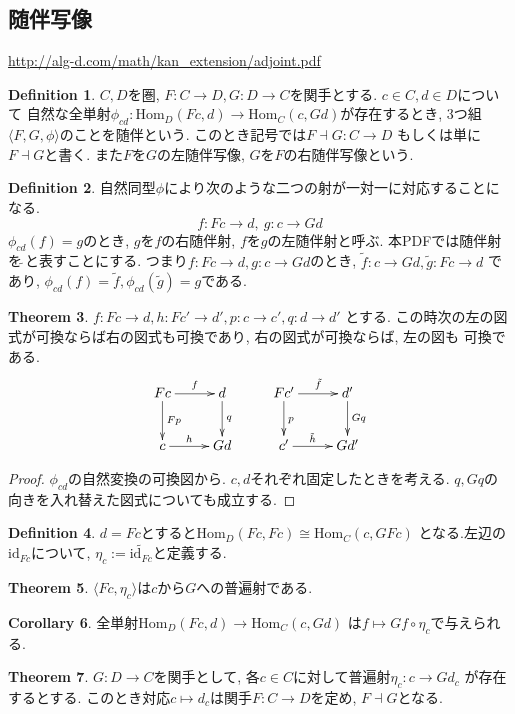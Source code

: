 \documentclass[a4paper,10pt]{article}
\theoremstyle{definition}
\newtheorem{thm}{\bfseries Theorem}[section]
\newtheorem{definition}[thm]{\bfseries Definition}
\newtheorem{cor}[thm]{\bfseries Corollary}
\begin{document}
\subsection{随伴写像}
\url{http://alg-d.com/math/kan_extension/adjoint.pdf}
\begin{definition}
    $C, D$を圏, $F: C \rightarrow D, G: D \rightarrow C$を関手とする. $c \in C, d \in D$について
    自然な全単射$\phi_{cd}: \mathrm{Hom}_D(Fc, d) \rightarrow \mathrm{Hom}_C(c,Gd)$が存在するとき,
    3つ組$\langle F,G,\phi \rangle$のことを随伴という. このとき記号では$F \dashv G: C \rightarrow D$
    もしくは単に$F \dashv G$と書く. また$F$を$G$の左随伴写像, $G$を$F$の右随伴写像という.
\end{definition}
\begin{definition}
    自然同型$\phi$により次のような二つの射が一対一に対応することになる.
    \[ f:Fc \rightarrow d, \ g:c \rightarrow Gd \]
    $\phi_{cd}(f) = g$のとき, $g$を$f$の右随伴射, $f$を$g$の左随伴射と呼ぶ.
    本PDFでは随伴射を$\tilde{\ }$と表すことにする. つまり$f:Fc \rightarrow d, g:
    c \rightarrow Gd$のとき, $\tilde{f}: c \rightarrow Gd, \tilde{g}: Fc \rightarrow d$
    であり, $\phi_{cd}(f) = \tilde{f}, \phi_{cd}(\tilde{g}) = g$である.
\end{definition}
\begin{thm}
    $f:Fc \rightarrow d, h:Fc' \rightarrow d', p: c \rightarrow c', q: d \rightarrow d'$
    とする. この時次の左の図式が可換ならば右の図式も可換であり, 右の図式が可換ならば, 左の図も
    可換である.
\begin{align*}
\xymatrix{
Fc \ar[r]^-{f} \ar[d]^-{Fp} & d \ar[d]^-{q}& 
Fc'\ar[r]^-{\tilde{f}} \ar[d]^{p} & d' \ar[d]^-{Gq} \\
c \ar[r]^-{h}& Gd
& c'\ar[r]^-{\tilde{h}}& Gd'
}
\end{align*}
\end{thm}
\begin{proof}
    $\phi_{cd}$の自然変換の可換図から. $c,d$それぞれ固定したときを考える.
    $q, Gq$の向きを入れ替えた図式についても成立する.
\end{proof}
\begin{definition}
    $d=Fc$とすると$\textrm{Hom}_D(Fc, Fc) \cong \textrm{Hom}_C(c, GFc)$
    となる.左辺の$\textrm{id}_{Fc}$について, $\eta_{c}:= \widetilde{\textrm{id}_{Fc}}$と定義する.
\end{definition}
\begin{thm}
    $\langle Fc, \eta_{c} \rangle$は$c$から$G$への普遍射である.
\end{thm}

\begin{cor}
    全単射$\textrm{Hom}_D(Fc, d) \rightarrow \textrm{Hom}_C(c, Gd)$
    は$f \mapsto Gf \circ \eta_c$で与えられる.
\end{cor}
\begin{thm}
    $G: D \rightarrow C$を関手として, 各$c \in C$に対して普遍射$\eta_c:c \rightarrow Gd_c$
    が存在するとする. このとき対応$c \mapsto d_c$は関手$F: C \rightarrow D$を定め, $F \dashv G$となる.
\end{thm}
\end{document}
